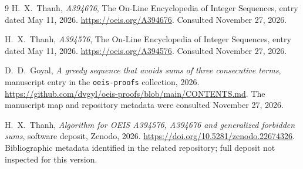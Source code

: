 \documentclass[11pt]{article}
\theoremstyle{remark}
\begin{document}
\small
\begin{thebibliography}{9}
H.~X.~Thanh, \emph{A394676}, The On-Line Encyclopedia of Integer Sequences,
entry dated May 11, 2026. \url{https://oeis.org/A394676}.
Consulted November 27, 2026.

H.~X.~Thanh, \emph{A394576}, The On-Line Encyclopedia of Integer Sequences,
entry dated May 11, 2026. \url{https://oeis.org/A394576}.
Consulted November 27, 2026.

D.~D.~Goyal, \emph{A greedy sequence that avoids sums of three consecutive
terms}, manuscript entry in the \texttt{oeis-proofs} collection, 2026.
\url{https://github.com/dvgyl/oeis-proofs/blob/main/CONTENTS.md}.
The manuscript map and repository metadata were consulted November 27, 2026.

H.~X.~Thanh, \emph{Algorithm for OEIS A394576, A394676 and generalized
forbidden sums}, software deposit, Zenodo, 2026.
\url{https://doi.org/10.5281/zenodo.22674326}.
Bibliographic metadata identified in the related repository; full deposit
not inspected for this version.
\end{thebibliography}
\end{document}
